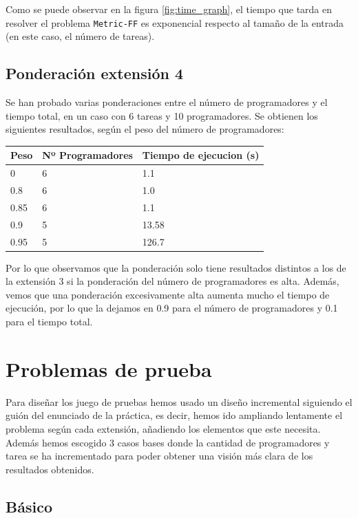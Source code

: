 \documentclass[12pt, titlepage]{article}
\begin{document}
Como se puede observar en la figura \ref{fig:time_graph}, el tiempo que tarda en
resolver el problema \texttt{Metric-FF} es exponencial respecto al tamaño de la
entrada (en este caso, el número de tareas).

\subsection{Ponderación extensión 4}

Se han probado varias ponderaciones entre el número de programadores y el tiempo total, en un caso con 6 tareas y 10 programadores. Se obtienen los siguientes resultados, según el peso del número de programadores:

\begin{table}[h]
\begin{longtable}{lll}
\toprule
Peso & Nº Programadores & Tiempo de ejecucion (s) \\
\midrule
\endhead
0 & 6 & 1.1 \\
0.8 & 6 & 1.0 \\
0.85 & 6 & 1.1 \\
0.9 & 5 & 13.58 \\
0.95 & 5 & 126.7 \\
\bottomrule
\end{longtable}
\end{table}

Por lo que observamos que la ponderación solo tiene resultados distintos a los de la extensión 3 si la ponderación del número de programadores es alta. Además, vemos que una ponderación excesivamente alta aumenta mucho el tiempo de ejecución, por lo que la dejamos en 0.9 para el número de programadores y 0.1 para el tiempo total.

\section{Problemas de prueba}

Para diseñar los juego de pruebas hemos usado un diseño incremental siguiendo el guión del enunciado de la práctica, es decir, hemos ido ampliando lentamente el problema según cada extensión, añadiendo los elementos que este necesita. Además hemos escogido 3 casos bases donde la cantidad de programadores y tarea se ha incrementado para poder obtener una visión más clara de los resultados obtenidos.

\subsection{Básico}
\end{document}
